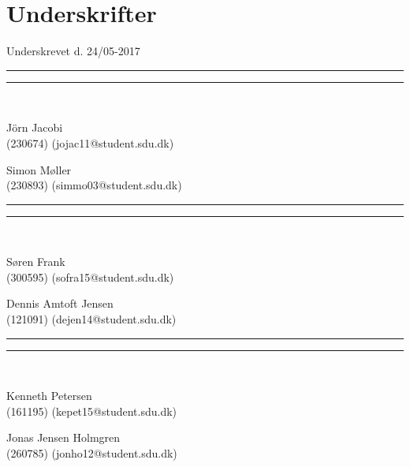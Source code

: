 
\section*{Underskrifter}
\vspace{3ex} \hfill Underskrevet d. 24/05-2017\\

\newlength{\streg} \setlength{\streg}{0.49\linewidth}
\vspace*{\fill} \rule{\streg}{1pt} \hfill \rule{\streg}{1pt}\\
\begin{minipage}[b]{\streg}
 \centering
 \rule{0pt}{4ex}
 J\"{o}rn Jacobi \\
 {\footnotesize (230674) (jojac11@student.sdu.dk)}
\end{minipage}
\hfill
\begin{minipage}[b]{\streg}
 \centering
 Simon Møller \\
 {\footnotesize (230893) (simmo03@student.sdu.dk)}
\end{minipage}

\vspace*{\fill} \rule{\streg}{1pt} \hfill \rule{\streg}{1pt}\\
\begin{minipage}[b]{\streg}
 \centering
 \rule{0pt}{4ex}
 Søren Frank \\
 {\footnotesize (300595) (sofra15@student.sdu.dk)}
\end{minipage}
\hfill
\begin{minipage}[b]{\streg}
 \centering
 Dennis Amtoft Jensen \\
 {\footnotesize (121091) (dejen14@student.sdu.dk)}
\end{minipage}

\vspace*{\fill} \rule{\streg}{1pt} \hfill \rule{\streg}{1pt}\\
\begin{minipage}[b]{\streg}
	\centering
	\rule{0pt}{4ex}
	Kenneth Petersen \\
	{\footnotesize (161195) (kepet15@student.sdu.dk)}
\end{minipage}
\hfill
\begin{minipage}[b]{\streg}
	\centering
	Jonas Jensen Holmgren  \\
	{\footnotesize (260785) (jonho12@student.sdu.dk)}
\end{minipage}